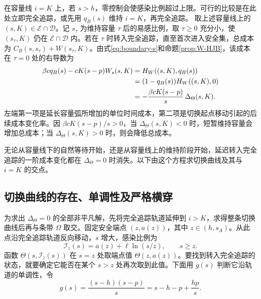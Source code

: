 \documentclass[lang=cn,a4paper,newtx]{elegantpaper}
\theoremstyle{plain}
\theoremstyle{definition}
\newcommand{\Dcal}{\mathcal D}
\begin{document}
在容量线 $i=K$ 上，若 $s>h$，零控制会使感染比例超过上限。可行的比较是在此处立即完全追踪，或先用 $q_B(s)$ 维持 $i=K$，再完全追踪。
取上述容量线上的 $(s,K)\in\mathcal E\cap\Dcal$。记 $s_\tau$ 为维持容量 $\tau$ 后的易感比例，取 $\tau\ge0$ 充分小，使 $(s_\tau,K)$ 仍在 $\mathcal E\cap\Dcal$ 内。若在 $\tau$ 时转入完全追踪，直至首次进入安全集，总成本为 $C_B(s,s_\tau)+W(s_\tau,K)$。由式\eqref{eq:boundary-s}和命题\ref{prop:W-HJB}，该成本在 $\tau=0$ 处的右导数为
\begin{align}
 \beta c q_B(s)-cK(s-p)W_s(s,K)
 &=H_W((s,K),q_B(s))\notag\\
 &=(1-q_B(s))H_W((s,K),0)\notag\\
 &=-\frac{\beta cK(s-p)}s\,\Delta_\Theta(s,K).
 \label{eq:capacity-marginal-cost}
\end{align}
左端第一项是延长容量弧所增加的单位时间成本，第二项是切换起点移动引起的后续成本变化率。因 $\beta cK(s-p)/s>0$，当 $\Delta_\Theta(s,K)<0$ 时，短暂维持容量会增加总成本；当 $\Delta_\Theta(s,K)>0$ 时，则会降低总成本。

无论从容量线下的自然等待开始，还是从容量线上的维持阶段开始，延迟转入完全追踪的一阶成本变化都在 $\Delta_\Theta=0$ 时消失。以下由这个方程求切换曲线及其与 $i=K$ 的交点。

\subsection{切换曲线的存在、单调性及严格横穿}
\label{sec:switching-curve}
为求出 $\Delta_\Theta=0$ 的全部非平凡解，先将完全追踪轨道延伸到 $i>K$，求得整条切换曲线后再与条带 $\Omega$ 取交。固定安全端点 $(z,a(z))$，其中 $z\in(h,s_A)$。从此点沿完全追踪轨道反向移动，$s$ 增大，感染比例为
\begin{equation}
\mathcal I_z(s)=a(z)+\ell\ln(s/z),\qquad s\ge z.
\label{eq:q1-backward}
\end{equation}
函数 $\Theta(s,\mathcal I_z(s))$ 在 $s=z$ 处取端点值 $\Theta(z,a(z))$。要找到转入完全追踪的状态，就要确定它能否在某个 $s>z$ 处再次取到此值。下面用 $g(s)$ 判断它沿轨道的单调性，令
\begin{equation}
g(s)=\frac{(s-h)(s-p)}s=s-h-p+\frac{hp}{s}.
\label{eq:g}
\end{equation}
\end{document}
